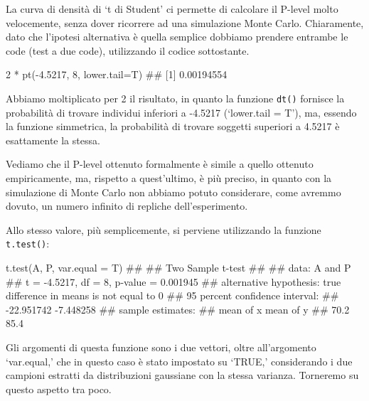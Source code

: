 \documentclass[a4paper,12pt,oneside]{book}
\newenvironment{Shaded}{\begin{snugshade}}{\end{snugshade}}
\newcommand{\DecValTok}[1]{#1}
\newcommand{\FloatTok}[1]{#1}
\newcommand{\SpecialCharTok}[1]{#1}
\newcommand{\DocumentationTok}[1]{#1}
\newcommand{\FunctionTok}[1]{#1}
\newcommand{\AttributeTok}[1]{#1}
\newcommand{\NormalTok}[1]{#1}
\begin{document}
La curva di densità di `t di Student' ci permette di calcolare il P-level molto velocemente, senza dover ricorrere ad una simulazione Monte Carlo. Chiaramente, dato che l'ipotesi alternativa è quella semplice dobbiamo prendere entrambe le code (test a due code), utilizzando il codice sottostante.

\begin{Shaded}
\begin{Highlighting}[]
\DecValTok{2} \SpecialCharTok{*} \FunctionTok{pt}\NormalTok{(}\SpecialCharTok{{-}}\FloatTok{4.5217}\NormalTok{, }\DecValTok{8}\NormalTok{, }\AttributeTok{lower.tail=}\NormalTok{T) }
\DocumentationTok{\#\# [1] 0.00194554}
\end{Highlighting}
\end{Shaded}

Abbiamo moltiplicato per 2 il risultato, in quanto la funzione \texttt{dt()} fornisce la probabilità di trovare individui inferiori a -4.5217 (`lower.tail = T'), ma, essendo la funzione simmetrica, la probabilità di trovare soggetti superiori a 4.5217 è esattamente la stessa.

Vediamo che il P-level ottenuto formalmente è simile a quello ottenuto empiricamente, ma, rispetto a quest'ultimo, è più preciso, in quanto con la simulazione di Monte Carlo non abbiamo potuto considerare, come avremmo dovuto, un numero infinito di repliche dell'esperimento.

Allo stesso valore, più semplicemente, si perviene utilizzando la funzione \texttt{t.test()}:

\begin{Shaded}
\begin{Highlighting}[]
\FunctionTok{t.test}\NormalTok{(A, P, }\AttributeTok{var.equal =}\NormalTok{ T)}
\DocumentationTok{\#\# }
\DocumentationTok{\#\#  Two Sample t{-}test}
\DocumentationTok{\#\# }
\DocumentationTok{\#\# data:  A and P}
\DocumentationTok{\#\# t = {-}4.5217, df = 8, p{-}value = 0.001945}
\DocumentationTok{\#\# alternative hypothesis: true difference in means is not equal to 0}
\DocumentationTok{\#\# 95 percent confidence interval:}
\DocumentationTok{\#\#  {-}22.951742  {-}7.448258}
\DocumentationTok{\#\# sample estimates:}
\DocumentationTok{\#\# mean of x mean of y }
\DocumentationTok{\#\#      70.2      85.4}
\end{Highlighting}
\end{Shaded}

Gli argomenti di questa funzione sono i due vettori, oltre all'argomento `var.equal,' che in questo caso è stato impostato su `TRUE,' considerando i due campioni estratti da distribuzioni gaussiane con la stessa varianza. Torneremo su questo aspetto tra poco.
\end{document}
